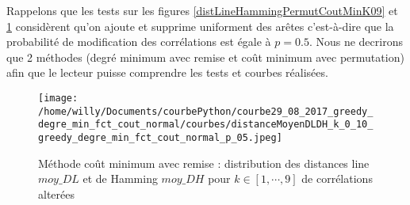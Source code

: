 \documentclass[onecolumn, 12pt]{book}
\begin{document}
Rappelons que les tests sur les figures \ref{distLineHammingPermutCoutMinK09} et \ref{distLineHammingGreedyDegreMinK09} consid\`erent qu'on ajoute et supprime uniforment des ar\^etes c'est-\`a-dire que la probabilit\'e de modification des corr\'elations est \'egale \`a $p = 0.5$. 
Nous ne decrirons que 2 m\'ethodes (degr\'e minimum avec remise et co\^ut minimum avec permutation) afin que le lecteur puisse comprendre les tests et courbes r\'ealis\'ees. \newline

\begin{centering} 
\begin{figure}[htb!] 
\texttt{[image: /home/willy/Documents/courbePython/courbe29\_08\_2017\_greedy\_degre\_min\_fct\_cout\_normal/courbes/distanceMoyenDLDH\_k\_0\_10\_greedy\_degre\_min\_fct\_cout\_normal\_p\_05.jpeg]}
\caption{ M\'ethode co\^ut minimum avec remise : distribution des distances line $moy\_DL$ et de Hamming $moy\_DH$ pour $k \in [1, \cdots, 9]$ de corr\'elations alter\'ees}
\label{distLineHammingGreedyDegreMinK09} 
\end{figure}
\end{centering} 
\end{document}

